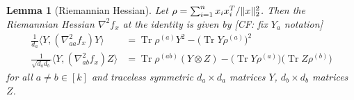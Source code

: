 \documentclass[aos]{imsart}
\newtheorem{lemma}[theorem]{Lemma}
\theoremstyle{definition}
\numberwithin{equation}{section}
\DeclareMathOperator{\tr}{Tr}
\DeclarePairedDelimiter{\norm}{\lVert}{\rVert}
\newcommand{\ot}{\otimes}
\newcommand{\samp}{x}
\newcommand{\CF}[1]{{\color{purple}[CF: #1]}}
\begin{document}
\begin{lemma}[Riemannian Hessian]\label{lem:hessian}
Let $\rho = \sum_{i=1}^n \samp_i \samp_i^T / \norm{\samp}_2^2$.
Then the Riemannian Hessian $\nabla^2 f_{\samp}$ at the identity is given by \CF{fix $Y_a$ notation}
\begin{align*}
 \frac{1}{d_a} \langle Y,  \left( \nabla^2_{aa} f_{\samp} \right) Y \rangle
&=  \tr \rho^{(a)} Y^2 - \bigl(\tr Y \rho^{(a)}\bigr)^2 \\
  \frac1{\sqrt{d_a d_b}} \langle Y,  \left( \nabla^2_{ab} f_{\samp} \right) Z \rangle
&= \tr \rho^{(ab)} \left( Y \ot Z \right) - \bigl(\tr Y \rho^{(a)}\bigr)\bigl(\tr Z \rho^{(b)}\bigr)
\end{align*}
for all $a\neq b\in[k]$ and traceless symmetric $d_a\times d_a$ matrices $Y$, $d_b\times d_b$ matrices~$Z$.
\end{lemma}
\end{document}

